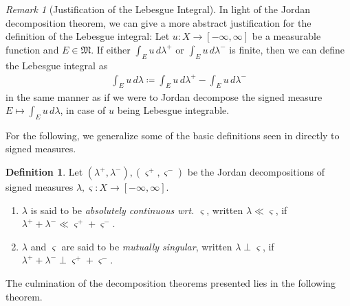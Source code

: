 \documentclass[10pt, leqno]{amsart}
\theoremstyle{definition}
\newtheorem{definition}{Definition}[section]
\theoremstyle{remark}
\newtheorem{remark}[theorem]{Remark}
\begin{document}
    \begin{remark}[Justification of the Lebesgue Integral]
        In light of the Jordan decomposition theorem, we can give a more abstract justification for the definition of the Lebesgue integral: Let \(u\colon X \to [-\infty, \infty]\) be a measurable function and \(E \in \mathfrak{M}\). If either \(\int_E u \, d\lambda^+\) or \(\int_E u \, d\lambda^-\) is finite, then we can define the Lebesgue integral as
        \begin{align}
            \int_E u \, d\lambda \coloneqq \int_E u \, d\lambda^+ - \int_E u \, d\lambda^-
        \end{align}
        in the same manner as if we were to Jordan decompose the signed measure \(E \mapsto \int_E u \, d\lambda\), in case of \(u\) being Lebesgue integrable.
    \end{remark}

    For the following, we generalize some of the basic definitions seen in  directly to signed measures.

    \begin{definition}
        Let \((\lambda^+, \lambda^-), (\varsigma^+, \varsigma^-)\) be the Jordan decompositions of signed measures \(\lambda, \varsigma\colon X \to [-\infty, \infty]\).
        \begin{enumerate}[label=(\roman*)]
            \item \(\lambda\) is said to be \emph{absolutely continuous wrt. \(\varsigma\)}, written \(\lambda \ll \varsigma\), if \(\lambda^++\lambda^- \ll \varsigma^++\varsigma^-\).
            \item \(\lambda\) and \(\varsigma\) are said to be \emph{mutually singular}, written \(\lambda \perp \varsigma\), if \(\lambda^++\lambda^- \perp \varsigma^+ + \varsigma^-\).
        \end{enumerate}
    \end{definition}

    The culmination of the decomposition theorems presented lies in the following theorem.
\end{document}
